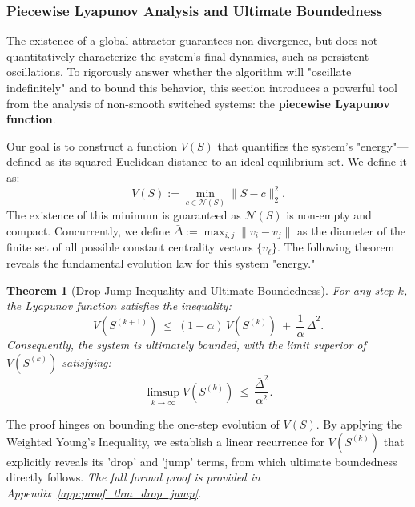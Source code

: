 \documentclass[journal]{IEEEtran}
\newtheorem{theorem}{Theorem}
\begin{document}
\subsubsection{Piecewise Lyapunov Analysis and Ultimate Boundedness}
\label{subsec:lyapunov}

The existence of a global attractor guarantees non-divergence, but does not quantitatively characterize the system's final dynamics, such as persistent oscillations. To rigorously answer whether the algorithm will "oscillate indefinitely" and to bound this behavior, this section introduces a powerful tool from the analysis of non-smooth switched systems: the \textbf{piecewise Lyapunov function}.

Our goal is to construct a function $V(S)$ that quantifies the system's "energy"—defined as its squared Euclidean distance to an ideal equilibrium set. We define it as:
\begin{equation}\label{eq:lyapunov_def}
V(S):=\min_{c\in\mathcal N(S)}\|S-c\|_2^2.
\end{equation}
The existence of this minimum is guaranteed as $\mathcal N(S)$ is non-empty and compact. Concurrently, we define $\bar{\Delta} := \max_{i,j} \|v_i - v_j\|$ as the diameter of the finite set of all possible constant centrality vectors $\{v_\ell\}$. The following theorem reveals the fundamental evolution law for this system "energy."

\begin{theorem}[Drop-Jump Inequality and Ultimate Boundedness]
\label{thm:drop_jump}
 For any step $k$, the Lyapunov function satisfies the inequality:
 \begin{equation}\label{eq:drop_jump_one_step}
 V(S^{(k+1)})\ \le\ (1-\alpha)\,V(S^{(k)})\ +\ \dfrac{1}{\alpha}\,\bar\Delta^{2}.
 \end{equation}
 Consequently, the system is ultimately bounded, with the limit superior of $V(S^{(k)})$ satisfying:
\begin{equation}\label{eq:limsup_boundedness}
\limsup_{k\to\infty}V(S^{(k)})\ \le\ \frac{\bar\Delta^{2}}{\alpha^2}.
\end{equation}
\end{theorem}
\begin{IEEEproof}
The proof hinges on bounding the one-step evolution of $V(S)$. By applying the Weighted Young's Inequality, we establish a linear recurrence for $V(S^{(k)})$ that explicitly reveals its 'drop' and 'jump' terms, from which ultimate boundedness directly follows. \textit{The full formal proof is provided in Appendix~\ref{app:proof_thm_drop_jump}.}
\end{IEEEproof}
\end{document}
